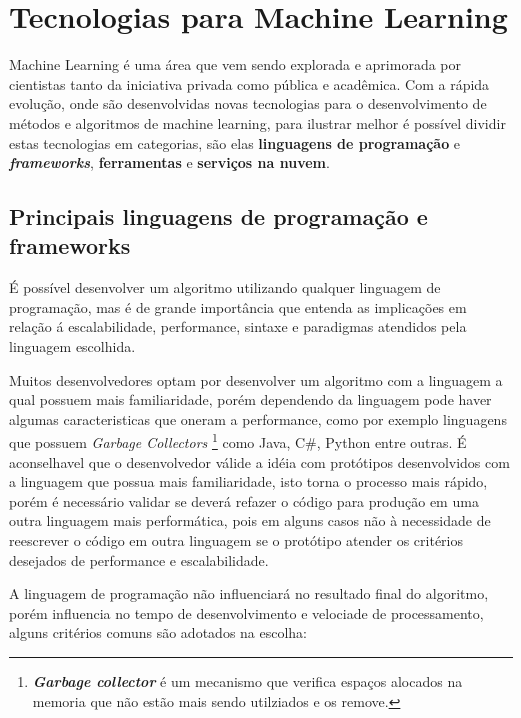 \section{Tecnologias para Machine Learning}
\label{sec:tech-ml}

Machine Learning é uma área que vem sendo explorada e aprimorada por cientistas tanto da iniciativa privada 
como pública e acadêmica. Com a rápida evolução, onde são desenvolvidas novas tecnologias para o desenvolvimento
de métodos e algoritmos de machine learning, para ilustrar melhor é possível  dividir estas tecnologias em categorias, são elas
\textbf{linguagens de programação} e \textbf{\textit{frameworks}}, \textbf{ferramentas} e \textbf{serviços na nuvem}. 

\subsection{Principais linguagens de programação e frameworks}
\label{subsec:ling-prog}

É possível desenvolver um algoritmo utilizando qualquer linguagem de programação, mas é de grande importância que entenda as implicações
em relação á escalabilidade, performance, sintaxe e paradigmas atendidos pela linguagem escolhida. 

Muitos desenvolvedores optam por desenvolver um algoritmo com a linguagem a qual possuem mais familiaridade, 
porém dependendo da linguagem pode haver algumas caracteristicas que  oneram a performance, como por exemplo linguagens que possuem 
\textit{Garbage Collectors} \footnote{\textbf{\textit{Garbage collector}} é um mecanismo que verifica espaços alocados na memoria que não estão mais sendo utilziados e os remove.} como Java, C\#, Python entre outras. É aconselhavel que o desenvolvedor válide a 
idéia com protótipos desenvolvidos com a linguagem que possua mais familiaridade, isto torna o processo mais rápido, porém é necessário
validar se deverá refazer o código para produção em uma outra linguagem mais performática, pois em alguns casos não à necessidade
de reescrever o código em outra linguagem se o protótipo atender os critérios desejados de performance e escalabilidade. 

A linguagem de programação não influenciará no resultado final do algoritmo, porém influencia no tempo de desenvolvimento e 
velociade de processamento, alguns critérios comuns são adotados na escolha:

